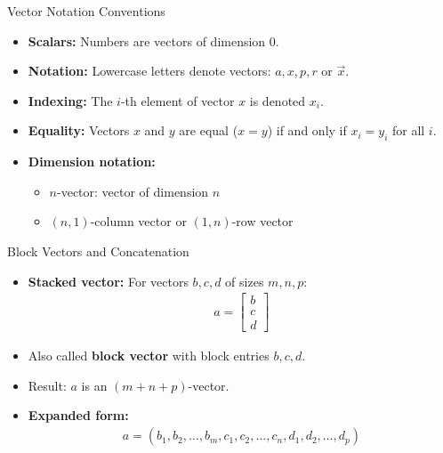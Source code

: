 \begin{frame}{Vector Notation Conventions}
    \begin{itemize}
        \item \textbf{Scalars:} Numbers are vectors of dimension 0.
        \item \textbf{Notation:} Lowercase letters denote vectors: $a, x, p, r$ or $\vec{x}$.
        \item \textbf{Indexing:} The $i$-th element of vector $x$ is denoted $x_i$.
        \item \textbf{Equality:} Vectors $x$ and $y$ are equal ($x = y$) if and only if $x_i = y_i$ for all $i$.
        \item \textbf{Dimension notation:} 
            \begin{itemize}
                \item $n$-vector: vector of dimension $n$
                \item $(n,1)$-column vector or $(1,n)$-row vector
            \end{itemize}
    \end{itemize}
\end{frame}

\begin{frame}{Block Vectors and Concatenation}
    \begin{itemize}
        \item \textbf{Stacked vector:} For vectors $b, c, d$ of sizes $m, n, p$:
        \begin{align}
            a = \begin{bmatrix} b \\ c \\ d \end{bmatrix}
        \end{align}
        \item Also called \textbf{block vector} with block entries $b, c, d$.
        \item Result: $a$ is an $(m+n+p)$-vector.
        \item \textbf{Expanded form:}
        \begin{align*}
            a = (b_1, b_2, \ldots, b_m, c_1, c_2, \ldots, c_n, d_1, d_2, \ldots, d_p)
        \end{align*}
    \end{itemize}
\end{frame}

